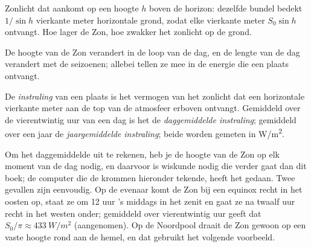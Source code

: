 \begin{omfigure}

{\small Zonlicht dat aankomt op een hoogte $h$ boven de horizon: dezelfde
bundel bedekt $1/\sin h$ vierkante meter horizontale grond, zodat elke
vierkante meter $S_0 \sin h$ ontvangt. Hoe lager de Zon, hoe zwakker het
zonlicht op de grond.}
\end{omfigure}

De hoogte van de Zon verandert in de loop van de dag, en de lengte van de dag
verandert met de seizoenen; allebei tellen ze mee in de energie die een plaats ontvangt.

\begin{definition}[Instraling]\label{def:g10:earth-energy-budget:insolation}
De \emph{instraling} van een plaats is het vermogen van het
zonlicht dat een horizontale vierkante meter aan de top van de atmosfeer
erboven ontvangt. Gemiddeld over de vierentwintig uur van een dag is het de
\emph{daggemiddelde instraling}; gemiddeld over een jaar de
\emph{jaargemiddelde instraling}; beide worden gemeten in \unit{W/m^2}.
\end{definition}

Om het daggemiddelde uit te rekenen, heb je de hoogte van de Zon op elk moment
van de dag nodig, en daarvoor is wiskunde nodig die verder gaat dan dit boek;
de computer die de krommen hieronder tekende, heeft het gedaan. Twee gevallen
zijn eenvoudig. Op de evenaar komt de Zon bij een equinox recht in het oosten
op, staat ze om 12 uur 's middags in het zenit en gaat ze na twaalf uur recht
in het westen onder; gemiddeld over vierentwintig uur geeft dat
$S_0/\pi \approx \qty{433}{W/m^2}$ (aangenomen). Op de Noordpool draait de
Zon gewoon op een vaste hoogte rond aan de hemel, en dat gebruikt het volgende
voorbeeld.


